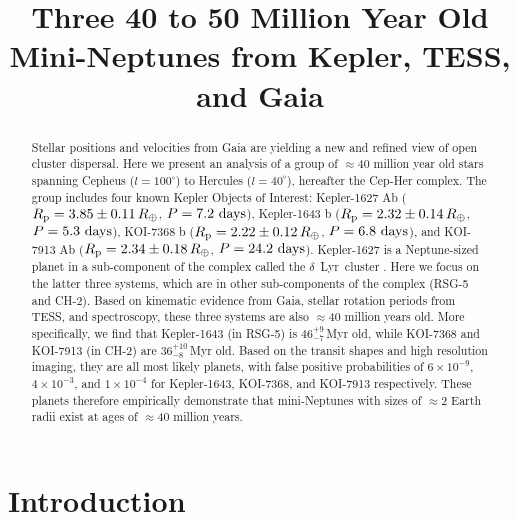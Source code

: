\documentclass[12pt,twocolumn,linenumbers]{aastex63}
\begin{document}
\title{
  Three 40 to 50 Million Year Old Mini-Neptunes from Kepler, TESS, and Gaia
}



\begin{abstract}
  Stellar positions and velocities from Gaia are yielding a new and
  refined view of open cluster dispersal.
  Here we present an analysis of a group of $\approx$40 million
  year old stars spanning Cepheus ($l=100^\circ$) to Hercules
  ($l=40^\circ$), hereafter the Cep-Her complex.
  The group includes four known Kepler Objects of Interest:
  Kepler-1627 Ab ($R_{\rm p} = 3.85 \pm 0.11\,R_\oplus$, $P = 7.2\ {\rm days}$),
  Kepler-1643 b ($R_{\rm p} = 2.32 \pm 0.14\,R_\oplus$, $P = 5.3\ {\rm days}$),
  KOI-7368 b ($R_{\rm p} = 2.22 \pm 0.12\,R_\oplus$, $P = 6.8\ {\rm days}$), and
  KOI-7913 Ab ($R_{\rm p} = 2.34 \pm 0.18\,R_\oplus$, $P = 24.2\ {\rm days}$).
  Kepler-1627 is a Neptune-sized planet in a sub-component of the
  complex called the $\delta$\ Lyr\ cluster
  \citep{bouma_kep1627_2022}.
  Here we focus on the latter three systems, which are in other
  sub-components of the complex (RSG-5 and CH-2).
  Based on kinematic evidence from Gaia, stellar rotation periods from
  TESS, and spectroscopy, these three systems are also $\approx$40
  million years old.
  More specifically, we find that Kepler-1643 (in RSG-5) is
  $46^{+9}_{-7}$\,Myr old, while KOI-7368 and KOI-7913 (in CH-2) are
  $36^{+10}_{-8}$\,Myr old.
  Based on the transit shapes and high resolution imaging, they are
  all most likely planets, with false positive probabilities of
  $6\times10^{-9}$, $4\times10^{-3}$, and $1\times10^{-4}$ for
  Kepler-1643, KOI-7368, and KOI-7913 respectively.
  These planets therefore empirically
  demonstrate that mini-Neptunes with sizes of $\approx$2 Earth
  radii exist at ages of $\approx$40 million years.
\end{abstract}





\section{Introduction}
\end{document}
